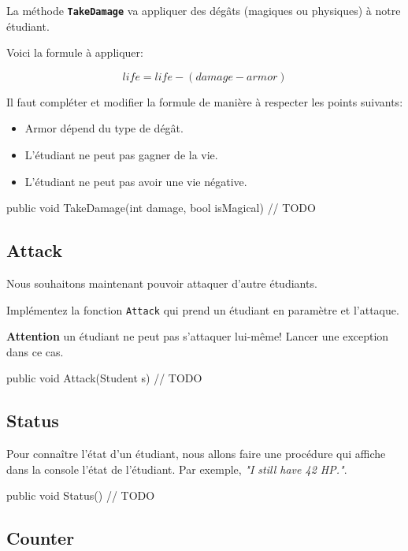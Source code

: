 La méthode \textbf{\texttt{TakeDamage}} va appliquer des dégâts (magiques ou physiques) à notre étudiant.

Voici la formule à appliquer:

$$
life = life - (damage - armor)
$$

Il faut compléter et modifier la formule de manière à respecter les points suivants:

\begin{itemize}
\item Armor dépend du type de dégât.
\item L'étudiant ne peut pas gagner de la vie.
\item L'étudiant ne peut pas avoir une vie négative.
\end{itemize}


\begin{code}
public void TakeDamage(int damage, bool isMagical)
{	
	// TODO
}
\end{code}

\subsection{Attack}

Nous souhaitons maintenant pouvoir attaquer d'autre étudiants.

Implémentez la fonction \texttt{Attack} qui prend un étudiant en paramètre et l'attaque.
\newline

\danger \textbf{Attention} un étudiant ne peut pas s'attaquer lui-même! Lancer une exception dans ce cas.
\begin{code}
public void Attack(Student s)
{	
	// TODO
}
\end{code}

\subsection{Status}

Pour connaître l'état d'un étudiant, nous allons faire une procédure qui affiche dans la console l'état de l'étudiant. Par exemple, \textit{"I still have 42 HP."}.

\begin{code}
public void Status()
{
	// TODO
}
\end{code}

\subsection{Counter}

